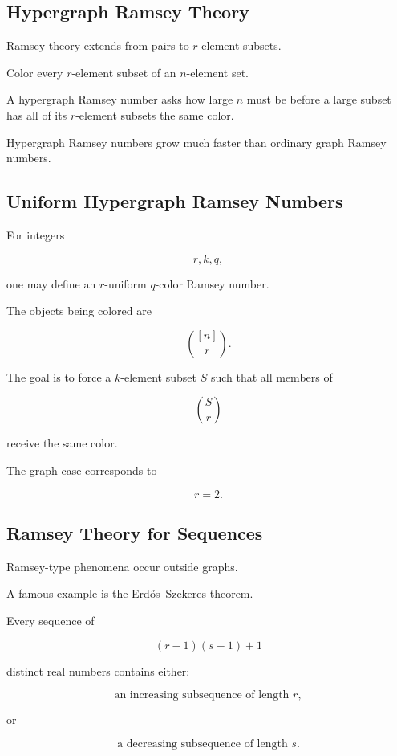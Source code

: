 \subsection{Hypergraph Ramsey Theory}
\label{subsec:hypergraph-ramsey}

Ramsey theory extends from pairs to \(r\)-element subsets.

Color every \(r\)-element subset of an \(n\)-element set.

A hypergraph Ramsey number asks how large \(n\) must be before a large
subset has all of its \(r\)-element subsets the same color.

Hypergraph Ramsey numbers grow much faster than ordinary graph Ramsey
numbers.

\subsection{Uniform Hypergraph Ramsey Numbers}
\label{subsec:uniform-hypergraph-ramsey}

For integers

\[
r,k,q,
\]

one may define an \(r\)-uniform \(q\)-color Ramsey number.

The objects being colored are

\[
\binom{[n]}{r}.
\]

The goal is to force a \(k\)-element subset \(S\) such that all members
of

\[
\binom{S}{r}
\]

receive the same color.

The graph case corresponds to

\[
r=2.
\]

\subsection{Ramsey Theory for Sequences}
\label{subsec:ramsey-sequences}

Ramsey-type phenomena occur outside graphs.

A famous example is the Erd\H{o}s--Szekeres theorem.

\begin{theorem}
Every sequence of

\[
(r-1)(s-1)+1
\]

distinct real numbers contains either:

\[
\text{an increasing subsequence of length }r,
\]

or

\[
\text{a decreasing subsequence of length }s.
\]
\end{theorem}

